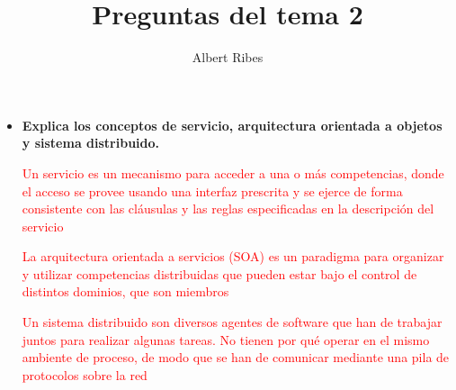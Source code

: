 \documentclass[a4paper,10pt]{article}
\title{Preguntas del tema 2}
\author{Albert Ribes}
\newcommand{\red}[1]{\textcolor{red}{#1}}
\begin{document}
\maketitle

\begin{abstract}

\end{abstract}

\begin{itemize}
  \item \textbf{
  Explica los conceptos de servicio, arquitectura orientada a objetos y sistema distribuido.
  }

\red{Un servicio es un mecanismo para acceder a una o más competencias, donde el acceso se provee usando una interfaz prescrita y se ejerce de forma consistente con las cláusulas y las reglas especificadas en la descripción del servicio}

\red{La arquitectura orientada a servicios (SOA) es un paradigma para organizar y utilizar competencias distribuidas que pueden estar bajo el control de distintos dominios, que son miembros}

\red{Un sistema distribuido son diversos agentes de software que han de trabajar juntos para realizar algunas tareas. No tienen por qué operar en el mismo ambiente de proceso, de modo que se han de comunicar mediante una pila de protocolos sobre la red}


\end{itemize}
\end{document}
